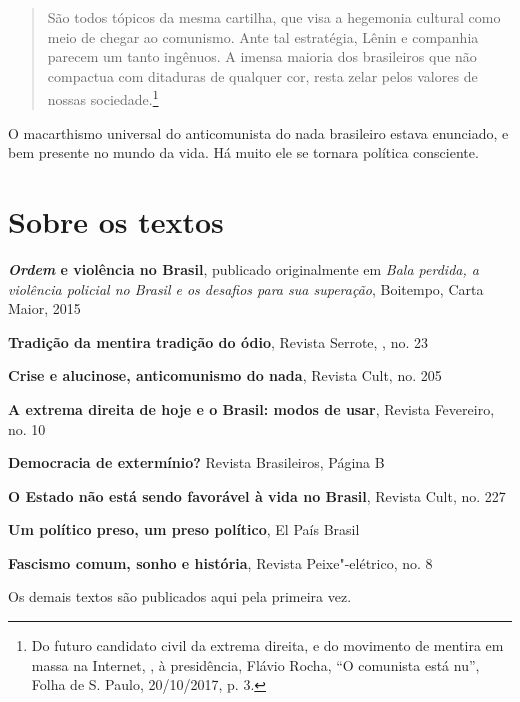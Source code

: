 \begin{quote}
São todos tópicos da mesma cartilha, que visa a hegemonia cultural como
meio de chegar ao comunismo. Ante tal estratégia, Lênin e companhia
parecem um tanto ingênuos. A imensa maioria dos brasileiros que não
compactua com ditaduras de qualquer cor, resta zelar pelos valores de
nossas sociedade.\footnote{Do futuro candidato civil da extrema
  direita, e do movimento de mentira em massa na Internet, , à
  presidência, Flávio Rocha, ``O comunista está nu'', Folha de S. Paulo,
  20/10/2017, p. 3.}
  \end{quote}

O macarthismo universal do anticomunista do nada brasileiro estava
enunciado, e bem presente no mundo da vida. Há muito ele se tornara
política consciente.

\chapter{Sobre os textos}

\textbf{\emph{Ordem} e violência no Brasil}, publicado originalmente em
\emph{Bala perdida, a violência policial no Brasil e os desafios para
sua superação}, Boitempo, Carta Maior, 2015

\medskip

\noindent\textbf{Tradição da mentira tradição do ódio}, Revista Serrote, , no. 23

\medskip

\noindent\textbf{Crise e alucinose, anticomunismo do nada}, Revista Cult, no. 205

\medskip

\noindent\textbf{A extrema direita de hoje e o Brasil: modos de usar}, Revista
Fevereiro, no. 10

\medskip

\noindent\textbf{Democracia de extermínio?} Revista Brasileiros, Página B

\medskip

\noindent\textbf{O Estado não está sendo favorável à vida no Brasil}, Revista
Cult, no. 227

\medskip

\noindent\textbf{Um político preso, um preso político}, El País Brasil

\medskip

\noindent\textbf{Fascismo comum, sonho e história}, Revista Peixe"-elétrico, no. 8

\medskip

\noindent Os demais textos são publicados aqui pela primeira vez.
